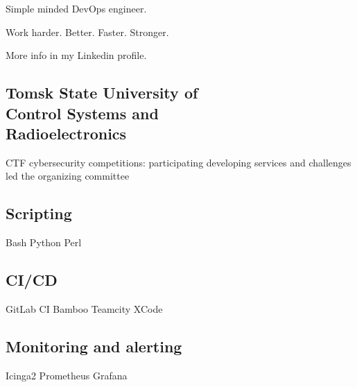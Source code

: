 \documentclass[a4paper]{MagicalCV}
\begin{document}
\lastupdated


\begin{minipage}[t]{0.33\textwidth} 


Simple minded DevOps engineer. 

Work harder. Better. Faster. Stronger.

More info in my Linkedin profile.
\sectionsep




\sectionsep


\subsection{Tomsk State University of \\ Control Systems and \\ Radioelectronics}
\vspace{\topsep} %
CTF cybersecurity competitions: participating \textbullet{} developing services and challenges \textbullet{} led the organizing committee
\sectionsep


\subsection{Scripting}
Bash \textbullet{} Python \textbullet{} Perl 
\subsection{CI/CD}
GitLab CI \textbullet{} Bamboo \textbullet{} Teamcity \textbullet{} XCode
\subsection{Monitoring and alerting}
Icinga2 \textbullet{} Prometheus \textbullet{} Grafana

\end{minipage}
\end{document}
